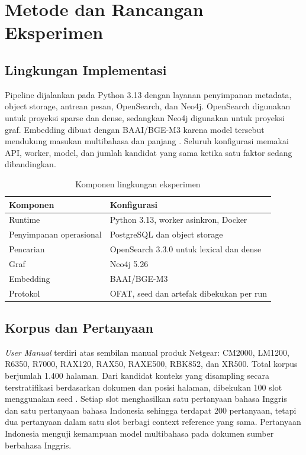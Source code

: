 \section{Metode dan Rancangan Eksperimen}

\subsection{Lingkungan Implementasi}

Pipeline dijalankan pada Python 3.13 dengan layanan penyimpanan metadata, object storage, antrean pesan, OpenSearch, dan Neo4j. OpenSearch digunakan untuk proyeksi sparse dan dense, sedangkan Neo4j digunakan untuk proyeksi graf. Embedding dibuat dengan BAAI/BGE-M3 karena model tersebut mendukung masukan multibahasa dan panjang \cite{chenM3Embedding2024}. Seluruh konfigurasi memakai API, worker, model, dan jumlah kandidat yang sama ketika satu faktor sedang dibandingkan.

\begin{table}[t]
\centering
\caption{Komponen lingkungan eksperimen}
\label{tab:lingkungan-paper}
\scriptsize
\begin{tabularx}{\columnwidth}{@{}l>{\raggedright\arraybackslash}X@{}}
\toprule
\textbf{Komponen} & \textbf{Konfigurasi}\\
\midrule
Runtime & Python 3.13, worker asinkron, Docker\\
Penyimpanan operasional & PostgreSQL dan object storage\\
Pencarian & OpenSearch 3.3.0 untuk lexical dan dense\\
Graf & Neo4j 5.26\\
Embedding & BAAI/BGE-M3\\
Protokol & OFAT, seed dan artefak dibekukan per run\\
\bottomrule
\end{tabularx}
\end{table}

\subsection{Korpus dan Pertanyaan}

\textit{User Manual} terdiri atas sembilan manual produk Netgear: CM2000, LM1200, R6350, R7000, RAX120, RAX50, RAXE500, RBK852, dan XR500. Total korpus berjumlah 1.400 halaman. Dari kandidat konteks yang disampling secara terstratifikasi berdasarkan dokumen dan posisi halaman, dibekukan 100 slot menggunakan seed . Setiap slot menghasilkan satu pertanyaan bahasa Inggris dan satu pertanyaan bahasa Indonesia sehingga terdapat 200 pertanyaan, tetapi dua pertanyaan dalam satu slot berbagi context reference yang sama. Pertanyaan Indonesia menguji kemampuan model multibahasa pada dokumen sumber berbahasa Inggris.

